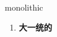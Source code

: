 
\begin{frame}
{\huge monolithic}
\begin{center}
\begin{enumerate}\Large
  \item \textbf{大一统的}
\end{enumerate}
\end{center}
\end{frame}
